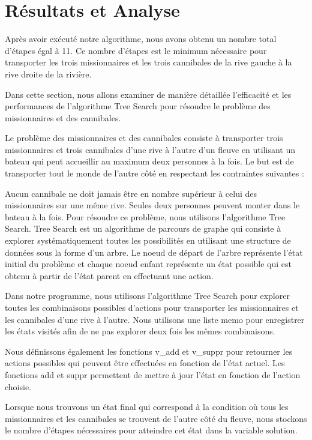 \documentclass{article}
\begin{document}
\section{Résultats et Analyse}
Après avoir exécuté notre algorithme, nous avons obtenu un nombre total d'étapes égal à 11. Ce nombre d'étapes est le minimum nécessaire pour transporter les trois missionnaires et les trois cannibales de la rive gauche à la rive droite de la rivière.


Dans cette section, nous allons examiner de manière détaillée l'efficacité et les performances de l'algorithme Tree Search pour résoudre le problème des missionnaires et des cannibales.

Le problème des missionnaires et des cannibales consiste à transporter trois missionnaires et trois cannibales d'une rive à l'autre d'un fleuve en utilisant un bateau qui peut accueillir au maximum deux personnes à la fois. Le but est de transporter tout le monde de l'autre côté en respectant les contraintes suivantes :

Aucun cannibale ne doit jamais être en nombre supérieur à celui des missionnaires sur une même rive.
Seules deux personnes peuvent monter dans le bateau à la fois.
Pour résoudre ce problème, nous utilisons l'algorithme Tree Search. Tree Search est un algorithme de parcours de graphe qui consiste à explorer systématiquement toutes les possibilités en utilisant une structure de données sous la forme d'un arbre. Le noeud de départ de l'arbre représente l'état initial du problème et chaque noeud enfant représente un état possible qui est obtenu à partir de l'état parent en effectuant une action.

Dans notre programme, nous utilisons l'algorithme Tree Search pour explorer toutes les combinaisons possibles d'actions pour transporter les missionnaires et les cannibales d'une rive à l'autre. Nous utilisons une liste memo pour enregistrer les états visités afin de ne pas explorer deux fois les mêmes combinaisons.

Nous définissons également les fonctions v\_add et v\_suppr pour retourner les actions possibles qui peuvent être effectuées en fonction de l'état actuel. Les fonctions add et suppr permettent de mettre à jour l'état en fonction de l'action choisie.

Lorsque nous trouvons un état final qui correspond à la condition où tous les missionnaires et les cannibales se trouvent de l'autre côté du fleuve, nous stockons le nombre d'étapes nécessaires pour atteindre cet état dans la variable solution.
\end{document}

